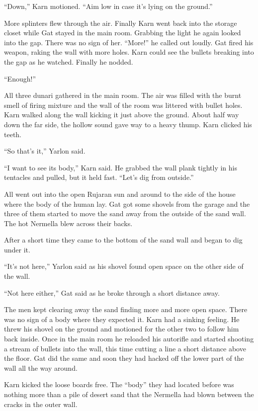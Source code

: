 ``Down,'' Karn motioned. ``Aim low in case it's lying on the ground.''

More splinters flew through the air. Finally Karn went back into the storage closet while Gat
stayed in the main room. Grabbing the light he again looked into the gap. There was no sign of
her. ``More!'' he called out loudly. Gat fired his weapon, raking the wall with more holes. Karn
could see the bullets breaking into the gap as he watched. Finally he nodded.

``Enough!''

All three dunari gathered in the main room. The air was filled with the burnt smell of firing
mixture and the wall of the room was littered with bullet holes. Karn walked along the wall
kicking it just above the ground. About half way down the far side, the hollow sound gave way to
a heavy thump. Karn clicked his teeth.

``So that's it,'' Yarlon said.

``I want to see its body,'' Karn said. He grabbed the wall plank tightly in his tentacles and
pulled, but it held fast. ``Let's dig from outside.''

All went out into the open Rujaran sun and around to the side of the house where the body of
the human lay. Gat got some shovels from the garage and the three of them started to move the
sand away from the outside of the sand wall. The hot Nermella blew across their backs.


After a short time they came to the bottom of the sand wall and began to dig under it.

``It's not here,'' Yarlon said as his shovel found open space on the other side of the wall.

``Not here either,'' Gat said as he broke through a short distance away.

The men kept clearing away the sand finding more and more open space. There was no sign of a
body where they expected it. Karn had a sinking feeling. He threw his shovel on the ground and
motioned for the other two to follow him back inside. Once in the main room he reloaded his
autorifle and started shooting a stream of bullets into the wall, this time cutting a line a
short distance above the floor. Gat did the same and soon they had hacked off the lower part of
the wall all the way around.

Karn kicked the loose boards free. The ``body'' they had located before was nothing more than a
pile of desert sand that the Nermella had blown between the cracks in the outer wall.

